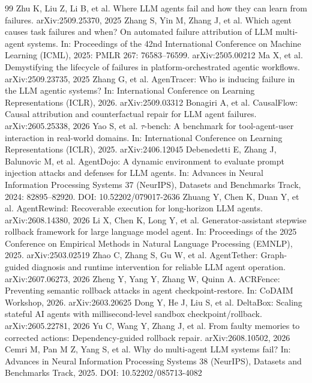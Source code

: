 \documentclass[review]{fcs}
\begin{document}
\begin{thebibliography}{99}
 Zhu K, Liu Z, Li B, et al. Where LLM agents fail and how they can learn from failures. arXiv:2509.25370, 2025
 Zhang S, Yin M, Zhang J, et al. Which agent causes task failures and when? On automated failure attribution of LLM multi-agent systems. In: Proceedings of the 42nd International Conference on Machine Learning (ICML), 2025: PMLR 267: 76583--76599. arXiv:2505.00212
 Ma X, et al. Demystifying the lifecycle of failures in platform-orchestrated agentic workflows. arXiv:2509.23735, 2025
 Zhang G, et al. AgenTracer: Who is inducing failure in the LLM agentic systems? In: International Conference on Learning Representations (ICLR), 2026. arXiv:2509.03312
 Bonagiri A, et al. CausalFlow: Causal attribution and counterfactual repair for LLM agent failures. arXiv:2605.25338, 2026
 Yao S, et al. $\tau$-bench: A benchmark for tool-agent-user interaction in real-world domains. In: International Conference on Learning Representations (ICLR), 2025. arXiv:2406.12045
 Debenedetti E, Zhang J, Balunovic M, et al. AgentDojo: A dynamic environment to evaluate prompt injection attacks and defenses for LLM agents. In: Advances in Neural Information Processing Systems 37 (NeurIPS), Datasets and Benchmarks Track, 2024: 82895--82920. DOI: 10.52202/079017-2636
 Zhuang Y, Chen K, Duan Y, et al. AgentRewind: Recoverable execution for long-horizon LLM agents. arXiv:2608.14380, 2026
 Li X, Chen K, Long Y, et al. Generator-assistant stepwise rollback framework for large language model agent. In: Proceedings of the 2025 Conference on Empirical Methods in Natural Language Processing (EMNLP), 2025. arXiv:2503.02519
 Zhao C, Zhang S, Gu W, et al. AgentTether: Graph-guided diagnosis and runtime intervention for reliable LLM agent operation. arXiv:2607.06273, 2026
 Zheng Y, Yang Y, Zhang W, Quinn A. ACRFence: Preventing semantic rollback attacks in agent checkpoint-restore. In: CoDAIM Workshop, 2026. arXiv:2603.20625
 Dong Y, He J, Liu S, et al. DeltaBox: Scaling stateful AI agents with millisecond-level sandbox checkpoint/rollback. arXiv:2605.22781, 2026
 Yu C, Wang Y, Zhang J, et al. From faulty memories to corrected actions: Dependency-guided rollback repair. arXiv:2608.10502, 2026
 Cemri M, Pan M Z, Yang S, et al. Why do multi-agent LLM systems fail? In: Advances in Neural Information Processing Systems 38 (NeurIPS), Datasets and Benchmarks Track, 2025. DOI: 10.52202/085713-4082

\end{thebibliography}
\end{document}
